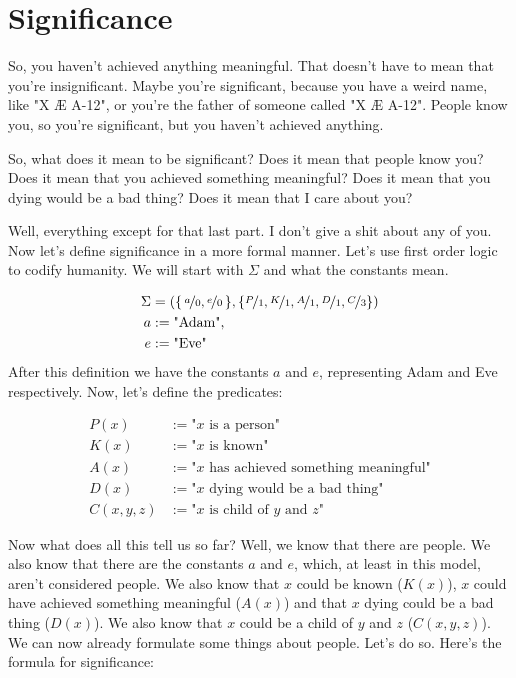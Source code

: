 \section{Significance}

So, you haven't achieved anything meaningful. That doesn't have to mean that you're insignificant. Maybe you're significant, because you have
a weird name, like "X Æ A-12", or you're the father of someone called "X Æ A-12". People know you, so you're significant, but you haven't achieved
anything.

\vspace{.5cm}

So, what does it mean to be significant? Does it mean that people know you? Does it mean that you achieved something meaningful?
Does it mean that you dying would be a bad thing? Does it mean that I care about you?

Well, everything except for that last part. I don't give a shit about any of you. Now let's define significance in a more formal manner.
Let's use first order logic to codify humanity. We will start with $\Sigma$ and what the constants mean.

$$
\begin{aligned}
  \Sigma &= \left( \right\{ \nicefrac{a}{0}, \nicefrac{e}{0} \left\}, \left\{ \nicefrac{P}{1}, \nicefrac{K}{1}, \nicefrac{A}{1}, \nicefrac{D}{1}, \nicefrac{C}{3} \right\} \right) \\
  a &:= \text{"Adam"}, \\
  e &:= \text{"Eve"}
\end{aligned}
$$
After this definition we have the constants $a$ and $e$, representing Adam and Eve respectively.
Now, let's define the predicates:

$$
\begin{aligned}
  P(x) &:= \text{"} x \text{ is a person"}\\
  K(x) &:= \text{"} x \text{ is known"}\\
  A(x) &:= \text{"} x \text{ has achieved something meaningful"}\\
  D(x) &:= \text{"} x \text{ dying would be a bad thing"}\\
  C(x, y, z) &:= \text{"} x \text{ is child of } y \text{ and } z \text{"}
\end{aligned}
$$

Now what does all this tell us so far? Well, we know that there are people. We also know that there are
the constants $a$ and $e$, which, at least in this model, aren't considered people. We also know that $x$
could be known ($K(x)$), $x$ could have achieved something meaningful ($A(x)$) and that $x$ dying could be
a bad thing ($D(x)$). We also know that $x$ could be a child of $y$ and $z$ ($C(x, y, z)$).
We can now already formulate some things about people. Let's do so.
Here's the formula for significance:

